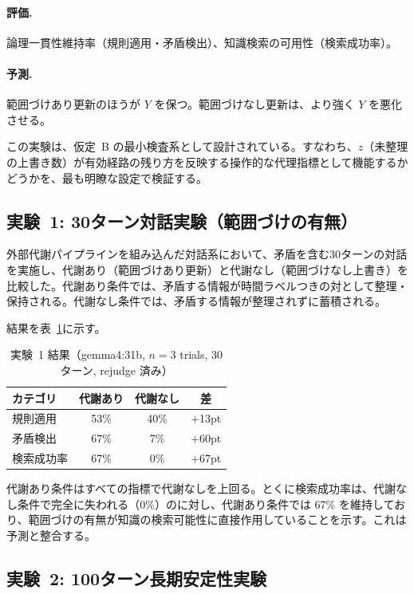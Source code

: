 \documentclass[12pt,a4paper]{article}
\begin{document}
\paragraph{評価.} 論理一貫性維持率（規則適用・矛盾検出）、知識検索の可用性（検索成功率）。

\paragraph{予測.} 範囲づけあり更新のほうが $Y$ を保つ。範囲づけなし更新は、より強く $Y$ を悪化させる。

この実験は、仮定~B の最小検査系として設計されている。すなわち、$z$（未整理の上書き数）が有効経路の残り方を反映する操作的な代理指標として機能するかどうかを、最も明瞭な設定で検証する。

\subsection{実験~1: 30ターン対話実験（範囲づけの有無）}

外部代謝パイプラインを組み込んだ対話系において、矛盾を含む30ターンの対話を実施し、代謝あり（範囲づけあり更新）と代謝なし（範囲づけなし上書き）を比較した。代謝あり条件では、矛盾する情報が時間ラベルつきの対として整理・保持される。代謝なし条件では、矛盾する情報が整理されずに蓄積される。

結果を表~\ref{tab:exp1}に示す。

\begin{table}[htbp]
\centering
\caption{実験~1 結果（gemma4:31b, $n=3$ trials, 30ターン, rejudge 済み）}\label{tab:exp1}
\begin{tabular}{lccc}
\toprule
カテゴリ & 代謝あり & 代謝なし & 差 \\
\midrule
規則適用     & 53\% & 40\% & $+$13pt \\
矛盾検出     & 67\% & 7\%  & $+$60pt \\
検索成功率   & 67\% & 0\%  & $+$67pt \\
\bottomrule
\end{tabular}
\end{table}

代謝あり条件はすべての指標で代謝なしを上回る。とくに検索成功率は、代謝なし条件で完全に失われる（0\%）のに対し、代謝あり条件では 67\% を維持しており、範囲づけの有無が知識の検索可能性に直接作用していることを示す。これは予測と整合する。

\subsection{実験~2: 100ターン長期安定性実験}
\end{document}

